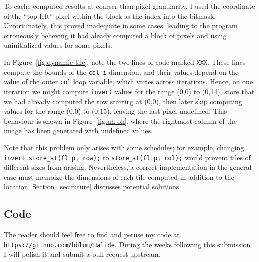 \documentclass{article}
\begin{document}
To cache computed results at coarser-than-pixel granularity, I used the coordinate of the ``top left'' pixel within the block as the index into the bitmask. Unfortunately, this proved inadequate in some cases, leading to the program erroneously believing it had aleady computed a block of pixels and using uninitialized values for some pixels.

In Figure~\ref{fig:dynamic-tile}, note the two lines of code marked \texttt{XXX}. These lines compute the bounds of the \texttt{col\_i} dimension, and their values depend on the value of the outer \texttt{col} loop variable, which varies across iterations. Hence, on one iteration we might compute \texttt{invert} values for the range (0,0) to (0,14), store that we had already computed the row starting at (0,0), then later skip computing values for the range (0,0) to (0,15), leaving the last pixel undefined. This behaviour is shown in Figure~\ref{fig:uh-oh}, where the rightmost column of the image has been generated with undefined values.

Note that this problem only arises with some schedules; for example, changing \texttt{invert.store\_at(flip, row);} to \texttt{store\_at(flip, col);} would prevent tiles of different sizes from arising. Nevertheless, a correct implementation in the general case must memoize the dimensions of each tile computed in addition to the location. Section~\ref{sec:future} discusses potential solutions.

\subsection{Code}

The reader should feel free to find and peruse my code at \texttt{https://github.com/bblum/Halide}. During the weeks following this submission I will polish it and submit a pull request upstream.
\end{document}
